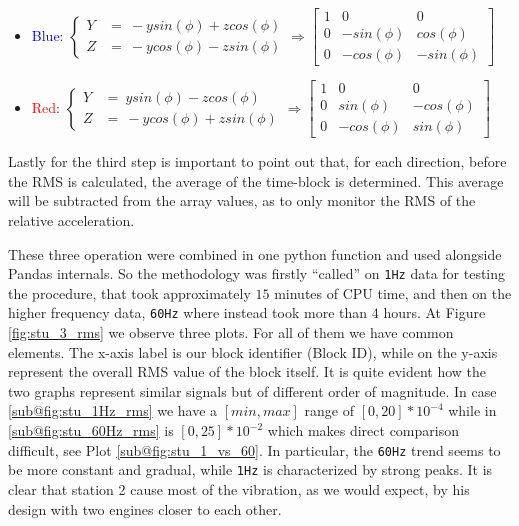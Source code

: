 \begin{itemize}
    \item \textcolor{blue}{Blue}: \( \left\{ 
        \begin{array}{cl} 
            Y & = \ -y sin(\phi) + z cos(\phi) \\
            Z & = \ -y cos(\phi) - z sin(\phi) 
        \end{array} \right. 
        \Rightarrow  
        \begin{bmatrix}
            1 & 0 & 0 \\
            0 & -sin(\phi) & cos(\phi)  \\
            0 & -cos(\phi) & -sin(\phi)  
        \end{bmatrix} \)
    \item \textcolor{red}{Red}: \( \left\{ 
        \begin{array}{cl}
            Y & = \ y sin(\phi) - z cos(\phi) \\
            Z & = \ -y cos(\phi) + z sin(\phi) 
        \end{array} \right. 
        \Rightarrow
        \begin{bmatrix}
            1 & 0 & 0 \\
            0 & sin(\phi) & -cos(\phi)  \\
            0 & -cos(\phi) & sin(\phi)  
        \end{bmatrix} \)
\end{itemize}
Lastly for the third step is important to point out that, for each direction, before the RMS is calculated, the average of the time-block is determined. 
This average will be subtracted from the array values, as to only monitor the RMS of the relative acceleration.

These three operation were combined in one python function and used alongside Pandas internals. So the methodology was firstly ``called'' on \texttt{1Hz} data for testing the procedure, that took approximately $15$ minutes of CPU time, 
and then on the higher frequency data, \texttt{60Hz} where instead took more than $4$ hours. At Figure \ref{fig:stu_3_rms} we observe three plots.
For all of them we have common elements. The x-axis label is our block identifier (Block ID), while on the y-axis represent the overall RMS value of the block itself. 
It is quite evident how the two graphs represent similar signals but of different order of magnitude. In case \ref{sub@fig:stu_1Hz_rms} we have a $[min, max]$ range of $[0,20] * 10^{-4}$ 
while in \ref{sub@fig:stu_60Hz_rms} is $[0,25] * 10^{-2}$ which makes direct comparison difficult, see Plot \ref{sub@fig:stu_1_vs_60}.
In particular, the \texttt{60Hz} trend seems to be more constant and gradual, while \texttt{1Hz} is characterized by strong peaks. It is clear that station 2 cause most of the vibration, 
as we would expect, by his design with two engines closer to each other.

